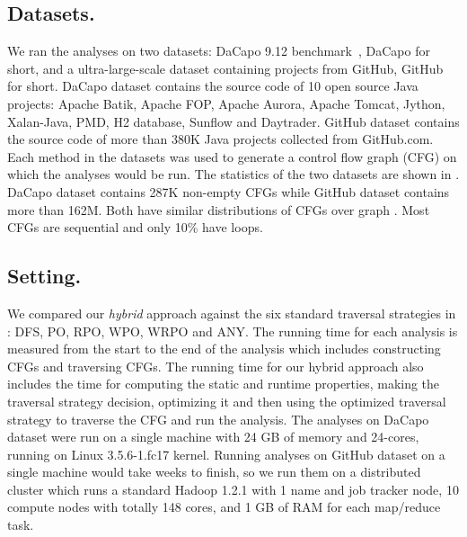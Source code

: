 \subsection{Datasets.} We ran the analyses on two datasets: DaCapo 9.12 benchmark~\cite{blackburn2006dacapo}, 
DaCapo for short, and a ultra-large-scale dataset containing projects from
GitHub, GitHub for short.
%
DaCapo dataset contains the source code of 10 open source Java projects: 
Apache Batik, Apache FOP, Apache Aurora, Apache Tomcat, Jython, Xalan-Java, 
PMD, H2 database, Sunflow and Daytrader. GitHub dataset contains the 
source code of more than 380K Java projects collected from 
GitHub.com. Each method in the datasets was used to generate a control 
flow graph (CFG) on which the analyses would be run. The statistics of the 
two datasets are shown in . DaCapo dataset contains 
287K non-empty CFGs while GitHub dataset contains more than 162M. Both 
have similar distributions of CFGs over graph \graphprop{}. Most CFGs are sequential 
and only 10\% have loops.

\subsection{Setting.} We compared our \textit{hybrid} approach against the six 
standard traversal strategies in : DFS, PO, RPO, WPO, 
WRPO and ANY. The running time for each analysis is measured from the start 
to the end of the analysis which includes constructing CFGs and traversing 
CFGs. The running time for our hybrid approach also includes the time for 
computing the static and runtime properties, making the traversal strategy 
decision, optimizing it and then using the optimized traversal strategy to 
traverse the CFG and run the analysis.
%
The analyses on DaCapo dataset were run on  a single machine with 24 GB of 
memory and 24-cores, running on Linux 3.5.6-1.fc17 kernel. Running analyses 
on GitHub dataset on a single machine would take weeks to finish, so we 
run them on a distributed cluster which runs a  standard  Hadoop 1.2.1 
with 1 name and job tracker node, 10 compute nodes with totally 148 cores, 
and 1 GB of RAM for each map/reduce task.


